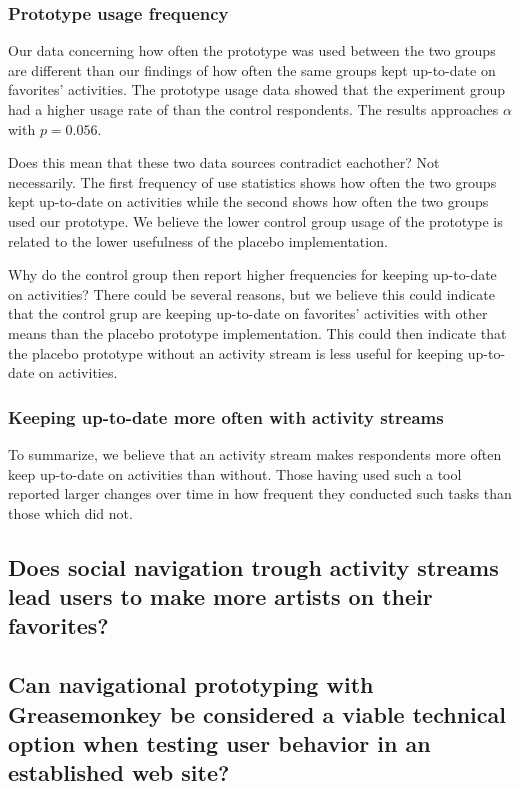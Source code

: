 \subsubsection{Prototype usage frequency}

Our data concerning how often the prototype was used between the two groups%
are different than our findings of how often the same groups kept up-to-date
on favorites' activities. The prototype usage data showed that the experiment
group had a higher usage rate of \latest{} than the control respondents. The
results approaches $\alpha$ with $p = 0.056$.

Does this mean that these two data sources contradict eachother? Not
necessarily. The first frequency of use statistics shows how often the two
groups kept up-to-date on activities while the second shows how often
the two groups used our prototype. We believe the lower control group usage of
the prototype is related to the lower usefulness of the placebo
implementation.

Why do the control group then report higher frequencies for keeping up-to-date
on activities? There could be several reasons, but we believe this could
indicate that the control grup are keeping up-to-date on favorites' activities
with other means than the placebo prototype implementation. This could then
indicate that the placebo prototype without an activity stream is less useful
for keeping up-to-date on activities.

\subsubsection{Keeping up-to-date more often with activity streams}

To summarize, we believe that an activity stream makes respondents
more often keep up-to-date on activities than without. Those having used such
a tool reported larger changes over time in how frequent they conducted such
tasks than those which did not.

\subsection{%
  Does social navigation trough activity streams lead users to make
  more artists on \urort{} their favorites?
}

\subsection{%
  Can navigational prototyping with Greasemonkey be considered a
  viable technical option when testing user behavior in an
  established web site?
}

